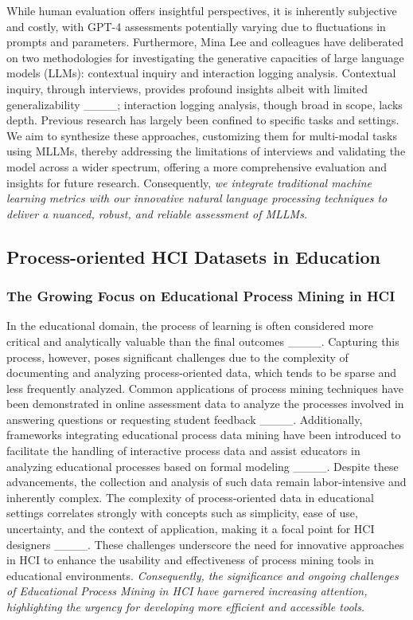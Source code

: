 While human evaluation offers insightful perspectives, it is inherently subjective and costly, with GPT-4 assessments potentially varying due to fluctuations in prompts and parameters. Furthermore, Mina Lee and colleagues have deliberated on two methodologies for investigating the generative capacities of large language models (LLMs): contextual inquiry and interaction logging analysis. Contextual inquiry, through interviews, provides profound insights albeit with limited generalizability ____; interaction logging analysis, though broad in scope, lacks depth. Previous research has largely been confined to specific tasks and settings. We aim to synthesize these approaches, customizing them for multi-modal tasks using MLLMs, thereby addressing the limitations of interviews and validating the model across a wider spectrum, offering a more comprehensive evaluation and insights for future research. Consequently, \textit{we integrate traditional machine learning metrics with our innovative natural language processing techniques to deliver a nuanced, robust, and reliable assessment of MLLMs.}
\subsection{Process-oriented HCI Datasets in Education}
\subsubsection{The Growing Focus on Educational Process Mining in HCI} In the educational domain, the process of learning is often considered more critical and analytically valuable than the final outcomes ____. Capturing this process, however, poses significant challenges due to the complexity of documenting and analyzing process-oriented data, which tends to be sparse and less frequently analyzed. Common applications of process mining techniques have been demonstrated in online assessment data to analyze the processes involved in answering questions or requesting student feedback ____. Additionally, frameworks integrating educational process data mining have been introduced to facilitate the handling of interactive process data and assist educators in analyzing educational processes based on formal modeling ____. Despite these advancements, the collection and analysis of such data remain labor-intensive and inherently complex. The complexity of process-oriented data in educational settings correlates strongly with concepts such as simplicity, ease of use, uncertainty, and the context of application, making it a focal point for HCI designers ____. These challenges underscore the need for innovative approaches in HCI to enhance the usability and effectiveness of process mining tools in educational environments. \textit{Consequently, the significance and ongoing challenges of Educational Process Mining in HCI have garnered increasing attention, highlighting the urgency for developing more efficient and accessible tools.}
